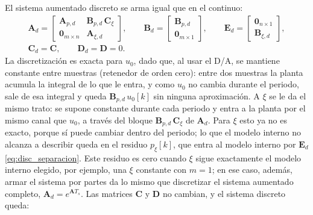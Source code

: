El sistema aumentado discreto se arma igual que en el continuo:
\begin{equation}
\begin{gathered}
\mathbf{A}_d =
\begin{bmatrix} \mathbf{A}_{p,d} & \mathbf{B}_{p,d}\,\mathbf{C}_{\xi} \\ \mathbf{0}_{m \times n} & \mathbf{A}_{\xi,d} \end{bmatrix},
\qquad
\mathbf{B}_d = \begin{bmatrix} \mathbf{B}_{p,d} \\ \mathbf{0}_{m \times 1} \end{bmatrix},
\qquad
\mathbf{E}_d = \begin{bmatrix} \mathbf{0}_{n \times 1} \\ \mathbf{B}_{\xi,d} \end{bmatrix},
\\[6pt]
\mathbf{C}_d = \mathbf{C}, \qquad \mathbf{D}_d = \mathbf{D} = 0 .
\end{gathered}
\label{eq:disc_armado}
\end{equation}
La discretización es exacta para $u_0$, dado que, al usar el D/A, se mantiene constante
entre muestras (retenedor de orden cero): entre dos muestras la planta acumula la integral
de lo que le entra, y como $u_0$ no cambia durante el periodo, sale de esa integral y queda
$\mathbf{B}_{p,d}\,u_0[k]$ sin ninguna aproximación. A $\xi$ se le da el mismo trato: se
supone constante durante cada periodo y entra a la planta por el mismo canal que $u_0$, a
través del bloque $\mathbf{B}_{p,d}\,\mathbf{C}_{\xi}$ de $\mathbf{A}_d$. Para $\xi$ esto ya
no es exacto, porque sí puede cambiar dentro del periodo; lo que el modelo interno no
alcanza a describir queda en el residuo $p_{\xi}[k]$, que entra al modelo interno por
$\mathbf{E}_d$ \eqref{eq:disc_separacion}. Este residuo es cero cuando $\xi$ sigue
exactamente el modelo interno elegido, por ejemplo, una $\xi$ constante con $m = 1$; en ese
caso, además, armar el sistema por partes da lo mismo que discretizar el sistema aumentado
completo, $\mathbf{A}_d = e^{\mathbf{A}T_s}$. Las matrices $\mathbf{C}$ y $\mathbf{D}$ no
cambian, y el sistema discreto queda:

